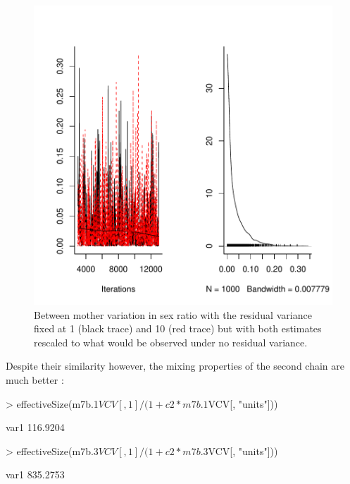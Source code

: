 \documentclass{article}
\begin{document}
\begin{figure}[!h]
\begin{center}
\includegraphics{Lecture8-022}
\end{center}
\caption{Between mother variation in sex ratio with the residual variance fixed at 1 (black trace) and 10 (red trace) but with both estimates rescaled to what would be observed under no residual variance.}
\label{sexratio3-fig}
\end{figure}

Despite their similarity however, the mixing properties of the second chain are much better \citep{vanDyk.2001}:

\begin{Schunk}
\begin{Sinput}
> effectiveSize(m7b.1$VCV[, 1]/(1 + c2 * m7b.1$VCV[, "units"]))
\end{Sinput}
\begin{Soutput}
    var1 
116.9204 
\end{Soutput}
\begin{Sinput}
> effectiveSize(m7b.3$VCV[, 1]/(1 + c2 * m7b.3$VCV[, "units"]))
\end{Sinput}
\begin{Soutput}
    var1 
835.2753 
\end{Soutput}
\end{Schunk}
\end{document}
